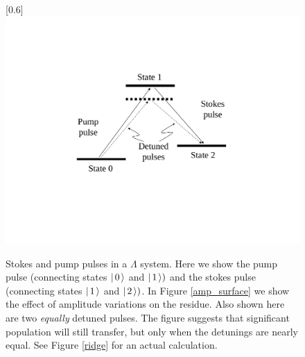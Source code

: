 \begin{figure}
\scalebox{0.6}[0.6]{
\includegraphics[bb=35 180 489 450]
{sp_detuning/sp_detuning.pdf}
}
\caption[Stokes and pump pulses in a $\Lambda$ system]{Stokes and pump pulses in a $\Lambda$ system. Here we show the pump pulse (connecting states $\left| \hspace{0.15em} 0 \hspace{0.15em}\right\rangle$ and $\left| \hspace{0.15em} 1 \hspace{0.15em}\right\rangle)$ and the stokes pulse (connecting states $\left| \hspace{0.15em} 1 \hspace{0.15em}\right\rangle$ and $\left| \hspace{0.15em} 2 \hspace{0.15em}\right\rangle)$. In Figure \ref{amp_surface} we show the effect of amplitude variations on the residue. Also shown here are two \emph{equally} detuned pulses. The figure suggests that significant population will still transfer, but only when the detunings are nearly equal. See Figure \ref{ridge} for an actual calculation.}
\label{sp_detuning}
\end{figure}
